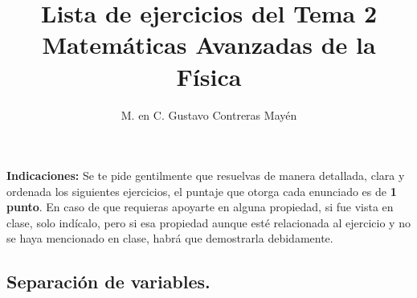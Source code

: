 \documentclass[hidelinks,12pt]{article}
\title{Lista de ejercicios del Tema 2 \\[0.3em]  \large{Matemáticas Avanzadas de la Física}\vspace{-3ex}}
\author{M. en C. Gustavo Contreras Mayén}
\date{ }
\begin{document}
\vspace{-4cm}
\maketitle

\fontsize{14}{14}\selectfont

\textbf{Indicaciones: } Se te pide gentilmente que resuelvas de manera detallada, clara y ordenada los siguientes ejercicios, el puntaje que otorga cada enunciado es de \textbf{1 punto}. En caso de que requieras apoyarte en alguna propiedad, si fue vista en clase, solo indícalo, pero si esa propiedad aunque esté relacionada al ejercicio y no se haya mencionado en clase, habrá que demostrarla debidamente.

\subsection*{Separación de variables.}
\end{document}
